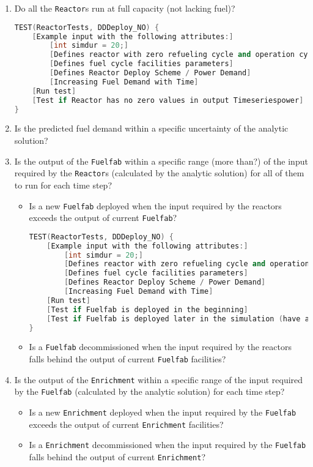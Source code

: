 \documentclass[12pt,letterpaper]{article}
\begin{document}
\begin{enumerate}
\item  Do all the \texttt{Reactor}s run at full capacity (not lacking fuel)? 
\begin{lstlisting}[language=C++]
TEST(ReactorTests, DDDeploy_NO) {
    [Example input with the following attributes:]
        [int simdur = 20;]
        [Defines reactor with zero refueling cycle and operation cycle of 1 month]
        [Defines fuel cycle facilities parameters]
        [Defines Reactor Deploy Scheme / Power Demand]
        [Increasing Fuel Demand with Time]
    [Run test]
    [Test if Reactor has no zero values in output Timeseriespower]
}
\end{lstlisting}

\item Is the predicted fuel demand within a specific uncertainty of the analytic solution? 

\item  Is the output of the \texttt{Fuelfab} within a specific range (more than?) of the input required by the \texttt{Reactor}s (calculated by the analytic solution) for all of them to run for each time step? 
\begin{itemize}
\item Is a new \texttt{Fuelfab} deployed when the input required by the reactors exceeds the output of current \texttt{Fuelfab}?
\begin{lstlisting}[language=C++]
TEST(ReactorTests, DDDeploy_NO) {
    [Example input with the following attributes:]
        [int simdur = 20;]
        [Defines reactor with zero refueling cycle and operation cycle of 1 month]
        [Defines fuel cycle facilities parameters]
        [Defines Reactor Deploy Scheme / Power Demand]
        [Increasing Fuel Demand with Time]
    [Run test]
    [Test if Fuelfab is deployed in the beginning]
    [Test if Fuelfab is deployed later in the simulation (have analytic solution)]
}
\end{lstlisting}
\item Is a \texttt{Fuelfab} decommissioned when the input required by the reactors falls behind the output of current \texttt{Fuelfab} facilities?
\end{itemize}

\item  Is the output of the \texttt{Enrichment} within a specific range of the input required by the \texttt{Fuelfab} (calculated by the analytic solution) for each time step? 
\begin{itemize}
\item Is a new \texttt{Enrichment} deployed when the input required by the \texttt{Fuelfab} exceeds the output of current \texttt{Enrichment} facilities?
\item Is a \texttt{Enrichment} decommissioned when the input required by the \texttt{Fuelfab} falls behind the output of current \texttt{Enrichment}?
\end{itemize}


\end{enumerate}
\end{document}
